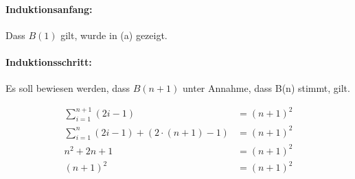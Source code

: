 \documentclass[11pt,a4paper]{article}
\begin{document}
\paragraph{Induktionsanfang:}
Dass $B(1)$ gilt, wurde in (a) gezeigt.

\paragraph{Induktionsschritt:}
Es soll bewiesen werden, dass $B(n+1)$ unter Annahme, dass B(n) stimmt, gilt.

\begin{align*}
    \sum_{i=1}^{n+1}{(2i-1)} &= (n+1)^2\\
    \sum_{i=1}^{n}{(2i-1)} + (2 \cdot (n+1) - 1) &= (n+1)^2\\
    n^2 + 2n +1 &= (n+1)^2\\
    (n+1)^2 &= (n+1)^2 \tag*{\checkmark}
\end{align*}

\section{}
\end{document}
